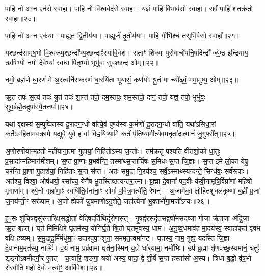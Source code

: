 पाहि नो अग्न एन॑से स्वा॒हा। 
पाहि नो विश्ववेद॑से स्वा॒हा। 
यज्ञं पाहि विभाव॑सो स्वा॒हा। 
सर्वं पाहि शतक्र॑तो स्वा॒हा॥२०॥
\anuvakamend

पा॒हि नो॑ अग्न॒ एक॑या। 
पा॒ह्यु॑त द्वि॒तीय॑या। 
पा॒ह्यूर्जं॑ तृ॒तीय॑या। 
पा॒हि गी॒र्भिश्च॑ त॒सृभि॑र्वसो॒ स्वाहा᳚॥२१॥
\anuvakamend

यश्छन्द॑सामृष॒भो वि॒श्वरू॑प॒श्छन्दो᳚भ्य॒श्छन्दाꣴ॑स्यावि॒वेश॑। 
सताꣳ शिक्यः पुरोवाचो॑पनि॒षदिन्द्रो᳚ ज्ये॒ष्ठ इ॑न्द्रि॒याय॒ ऋषि॑भ्यो॒ नमो॑ दे॒वेभ्यः॑ स्व॒धा पि॒तृभ्यो॒ भूर्भुवः॒ सुव॒श्छन्द॒ ओम्॥२२॥
\anuvakamend


नमो॒ ब्रह्म॑णे धा॒रणं॑ मे अ॒स्त्वनि॑राकरणं धा॒रयि॑ता भूयासं॒ कर्ण॑योः श्रु॒तं मा च्यो᳚ढ्वं॒ ममा॒मुष्य॒ ओम्॥२३॥
\anuvakamend

ऋ॒तं तपः॑ स॒त्यं तपः॑ श्रु॒तं तपः॑ शा॒न्तं तपो॒ दम॒स्तपः॒ शम॒स्तपो॒ दानं॒ तपो॒ यज्ञं॒ तपो॒ भूर्भुवः॒ सुव॒र्ब्रह्मै॒तदुपा᳚स्यै॒तत्तपः॑॥२४॥
\anuvakamend


यथा॑ वृ॒क्षस्य॑ स॒म्पुष्पि॑तस्य दू॒राद्ग॒न्धो वा᳚त्ये॒वं पुण्य॑स्य क॒र्मणो॑ दू॒राद्ग॒न्धो वा॑ति॒ यथा॑ऽसिधा॒रां क॒र्तेऽव॑हितामव॒क्रामे॒ यद्युवे॒ युवे॒ ह वा॑ वि॒ह्वयि॑ष्यामि क॒र्तं प॑तिष्या॒मीत्ये॒वम॒नृता॑दा॒त्मानं॑ जु॒गुफ्से᳚त्॥२५॥
\anuvakamend


अ॒णोरणी॑यान्मह॒तो मही॑याना॒त्मा गुहा॑यां॒ निहि॑तोऽस्य ज॒न्तोः। 
तम॑क्रतुं पश्यति वीतशो॒को धा॒तुः प्र॒सादा᳚न्महि॒मान॑\-मीशम्। 
स॒प्त प्रा॒णाः प्र॒भव॑न्ति॒ तस्मा᳚थ्स॒प्तार्चिषः॑ स॒मिधः॑ स॒प्त जि॒ह्वाः। 
स॒प्त इ॒मे लो॒का येषु॒ चर॑न्ति प्रा॒णा गु॒हाश॑यां॒ निहि॑ताः स॒प्त स॑प्त। 
अतः॑ समु॒द्रा गि॒रय॑श्च॒ सर्वे॒ऽस्माथ्स्यन्द॑न्ते॒ सिन्ध॑वः॒ सर्व॑रूपाः। 
अत॑श्च॒ विश्वा॒ ओष॑धयो॒ रसा᳚च्च॒ येनै॑ष भू॒तस्ति॑ष्ठत्यन्तरा॒त्मा। 
ब्र॒ह्मा दे॒वानां᳚ पद॒वीः क॑वी॒नामृषि॒र्विप्रा॑णां महि॒षो मृ॒गाणा᳚म्। 
श्ये॒नो गृध्रा॑णा॒ꣴ॒ स्वधि॑ति॒र्वना॑ना॒ꣳ॒ सोमः॑ प॒वित्र॒मत्ये॑ति॒ रेभन्। 
अ॒जामेकां॒ लोहि॑तशुक्लकृ॒ष्णां ब॒ह्वीं प्र॒जां ज॒नय॑न्ती॒ꣳ॒ सरू॑पाम्। 
अ॒जो ह्येको॑ जु॒षमा॑णोऽनु॒शेते॒ जहा᳚त्येनां भु॒क्तभो॑गा॒मजो᳚ऽन्यः॥२६॥

ह॒ꣳ॒सः शु॑चि॒षद्वसु॑रन्तरिक्ष॒सद्धोता॑ वेदि॒षदति॑थिर्दुरोण॒सत्। 
नृ॒षद्व॑र॒सदृ॑त॒सद्व्यो॑म॒सद॒ब्जा गो॒जा ऋ॑त॒जा अ॑द्रि॒जा ऋ॒तं बृ॒हत्। 
घृ॒तं मि॑मिक्षिरे घृ॒तम॑स्य॒ योनि॑र्घृ॒ते श्रि॒तो घृ॒तमु॑वस्य॒ धाम॑। 
अ॒नु॒ष्व॒धमाव॑ह मा॒दय॑स्व॒ स्वाहा॑कृतं वृषभ वक्षि ह॒व्यम्। 
स॒मु॒द्रादू॒र्मिर्मधु॑मा॒ꣳ॒ उदा॑रदुपा॒ꣳ॒शुना॒ सम॑मृत॒त्वमा॑नट्। 
घृ॒तस्य॒ नाम॒ गुह्यं॒ यदस्ति॑ जि॒ह्वा दे॒वाना॑म॒मृत॑स्य॒ नाभिः॑। 
व॒यं नाम॒ प्रब्र॑वामा घृ॒तेना॒स्मिन् य॒ज्ञे धा॑रयामा॒ नमो॑भिः। 
उप॑ ब्र॒ह्मा शृ॑णवच्छ॒स्यमा॑नं॒ चतुः॑ शृङ्गोऽवमीद्गौ॒र ए॒तत्। 
च॒त्वारि॒ शृङ्गा॒ त्रयो॑ अस्य॒ पादा॒ द्वे शी॒र्\mbox{}षे स॒प्त हस्ता॑सो अ॒स्य। 
त्रिधा॑ ब॒द्धो वृ॑ष॒भो रो॑रवीति म॒हो दे॒वो मर्त्या॒ꣳ॒ आवि॑वेश॥२७॥

